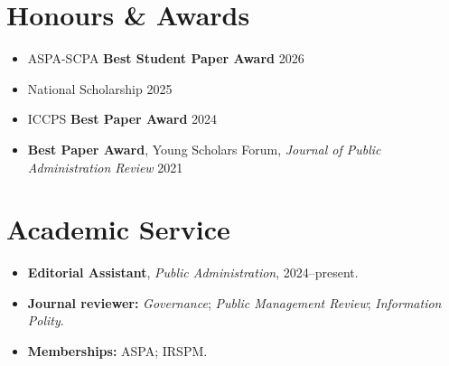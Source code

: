 \documentclass[10pt, a4paper]{article}
\begin{document}
\section{Honours \& Awards}

\begin{itemize}[leftmargin=2em, itemsep=3pt]
  \item ASPA-SCPA \textbf{Best Student Paper Award}
    \hfill {\color{soft}2026}
  \item National Scholarship
    \hfill {\color{soft}2025}
  \item ICCPS \textbf{Best Paper Award}
    \hfill {\color{soft}2024}
  \item \textbf{Best Paper Award}, Young Scholars Forum, \textit{Journal of Public Administration Review}
    \hfill {\color{soft}2021}
\end{itemize}

\section{Academic Service}

\begin{itemize}[leftmargin=2em, itemsep=3pt]
  \item \textbf{Editorial Assistant}, \textit{Public Administration}, 2024--present.
  \item \textbf{Journal reviewer:} \textit{Governance}; \textit{Public Management Review}; \textit{Information Polity}.
  \item \textbf{Memberships:} ASPA; IRSPM.
\end{itemize}
\end{document}

